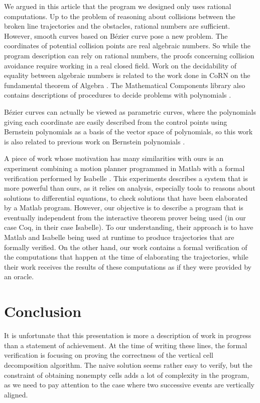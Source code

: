 \documentclass{llncs}
\begin{document}
We argued in this article that the program we designed only uses
rational computations.  Up to the problem of reasoning about
collisions between the broken line trajectories and the obstacles,
rational numbers are sufficient.  However, smooth curves based on
Bézier curve pose a new problem.  The coordinates of potential
collision points are real algebraic numbers.  So while the program
description can rely on rational numbers, the proofs concerning
collision avoidance require working in a real closed field.  Work on
the decidability of equality between algebraic numbers is related to
the work done in CoRN on the fundamental theorem of Algebra
\cite{GeuversWZ00}.  The Mathematical Components library also contains
descriptions of procedures to decide problems with polynomials
\cite{CohenMQERCF}.

Bézier curves can actually be viewed as parametric curves, where the
polynomials giving each coordinate are easily described from the
control points using Bernstein polynomials as a basis of the vector
space of polynomials, so this work is also related to previous work on
Bernstein polynomials \cite{basu:hal-01083587,BertotMahboubiGuilhot,Zsido2014}.

A piece of work whose motivation has many similarities with ours
is an experiment combining a motion planner programmed in Matlab with
a formal verification performed by Isabelle \cite{RizaldiISA18}.  This
experiments describes a system that is more powerful than ours, as it
relies on analysis, especially tools to reasons about solutions to
differential equations, to check solutions that have been elaborated by a
Matlab program.  However, our objective is to describe a program that
is eventually independent from the interactive theorem prover being
used (in our case Coq, in their case Isabelle).  To our understanding,
their approach is to have Matlab and Isabelle being used at runtime to
produce trajectories that are formally verified.  On the other hand,
our work contains a formal verification of the computations that happen at
the time of elaborating the trajectories, while their work receives
the results of these computations as if they were provided by an oracle.

\section{Conclusion}
It is unfortunate that this presentation is more a description of work
in progress than a statement of achievement.  At the time of writing
these lines, the formal verification is focusing on proving the
correctness of the vertical cell decomposition algorithm.  The naive
solution seems rather easy to verify, but the constraint of obtaining
nonempty cells adds a lot of complexity in the program, as we need to
pay attention to the case where two successive events are vertically
aligned.
\end{document}
